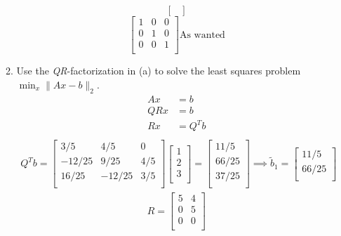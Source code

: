 \documentclass{article}
\newcommand{\twonorm}[1]{\| #1 \|_2}
\begin{document}
\begin{enumerate}
\begin{enumerate}
{\[\begin{bmatrix}
      \end{bmatrix} \] 
      \[ \begin{bmatrix}
        1 & 0 & 0 \\
        0 & 1 & 0 \\
        0 & 0 & 1\\
      \end{bmatrix} \text{As wanted} 
      \] 
      }
      \item Use the \textit{QR}-factorization in (a) to solve the least squares problem $\min_x\twonorm{Ax-b}$.
      \begin{align*}
          Ax &= b\\
          QRx &= b\\
          Rx &= Q^Tb\\
      \end{align*}
      \begin{align*}
          Q^Tb = 
          \begin{bmatrix} 
            3/5 & 4/5 & 0 \\ 
            -12/25 & 9/25 & 4/5 \\
            16/25 & -12/25 & 3/5 \\
          \end{bmatrix}
          \begin{bmatrix}
            1 \\
            2 \\
            3 \\
          \end{bmatrix}
          = 
          \begin{bmatrix}
            11/5 \\
            66/25 \\
            37/25 \\
          \end{bmatrix}
          \implies
          \tilde{b}_1 =
          \begin{bmatrix}
            11/5 \\
            66/25 \\
          \end{bmatrix}
      \end{align*}
      \begin{align*}
          R = 
          \begin{bmatrix}
            5 & 4 \\
            0 & 5 \\
            0 & 0 \\
          \end{bmatrix}

\end{align*}
\end{enumerate}
\end{enumerate}
\end{document}
